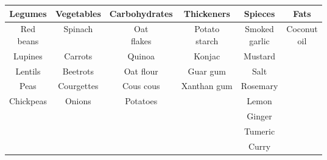 \begin{tabular}{cccccc}
	\toprule
		\textbf{Legumes} & \textbf{Vegetables} & \textbf{Carbohydrates} & \textbf{Thickeners} & \textbf{Spieces} & \textbf{Fats} \\
	\midrule
		\shortstack{Red\\beans}		& Spinach					& \shortstack{Oat\\flakes}						& \shortstack{Potato\\starch}	& \shortstack{Smoked\\garlic}	& \shortstack{Coconut\\oil} 	\\
		Lupines		& Carrots		& Quinoa					& Konjac		& Mustard						& 								\\
		Lentils		& Beetrots		& Oat flour					& Guar gum		& Salt							& 								\\
		Peas		& Courgettes	& Cous cous					& Xanthan gum	& Rosemary						& 								\\
		Chickpeas	& Onions		& Potatoes					& 				& Lemon							& 								\\
		 			& 				& 							& 				& Ginger						& 								\\
		 			& 				& 							& 				& Tumeric						& 								\\
		 			& 				& 							& 				& Curry							& 								\\
	\bottomrule
\end{tabular}